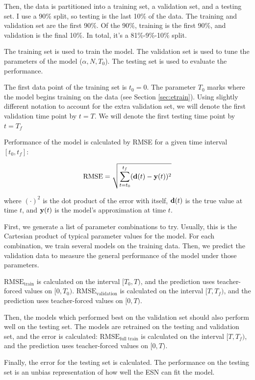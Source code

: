 \documentclass{article}
\begin{document}
Then, the data is partitioned into a training set, a validation set, and 
a testing set. I use a 90\% split, so testing is the last 10\% of the
data. The training and validation set are the first 90\%. Of the 90\%,
training is the first 90\%, and validation is the final 10\%. In total,
it's a 81\%-9\%-10\% split. 

The training set is used to train the model. The validation
set is used to tune the parameters of the model ($\alpha, N, T_0$). The
testing set is used to evaluate the performance.

The first data point of the training set is $t_0 = 0$. The parameter
$T_0$ marks where the model begins training on the data (see Section
\ref{sec:etrain}). Using slightly different notation to account for the
extra validation set, we will denote the first validation time point by
$t = T$. We will denote the first testing time point by $t = T_f$

Performance of the model is calculated by RMSE for a given time interval
$[t_0, t_f]$:

\begin{align}
    \text{RMSE} = \sqrt{\sum^{t_f}_{t=t_0} (\mathbf{d}(t) - \mathbf{y}(t))^2}
\end{align}

where $(\cdot)^2$ is the dot product of the error with itself,
$\mathbf{d}(t)$ is the true value at time $t$,
and $\mathbf{y}(t)$ is the model's approximation at time $t$.

First, we generate a list of parameter combinations to try. Usually, this
is the Cartesian product of typical parameter values for the model. 
For each combination, we train several models on the training data. Then,
we predict the validation data to measure the general performance of the
model under those parameters.

$\text{RMSE}_\text{train}$ is calculated on the interval $[T_0, T)$,
and the prediction uses teacher-forced values on $[0, T_0)$.
$\text{RMSE}_\text{validation}$ is calculated on the interval $[T, T_f)$,
and the prediction uses teacher-forced values on $[0, T)$.

Then, the models which performed best on the validation set should also
perform well on the testing set. The models are retrained on the testing
and validation set, and the error is calculated:
$\text{RMSE}_\text{full train}$ is calculated on the interval $[T, T_f)$,
and the prediction uses teacher-forced values on $[0, T)$.

Finally, the error for the testing set is calculated. 
The performance on the testing set is 
an unbias representation of how well the ESN can fit the model.
\end{document}
